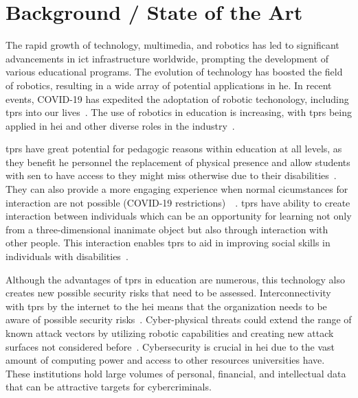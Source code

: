 
\newpage


\section{Background / State of the Art}

The rapid growth of technology, multimedia, and robotics has led to significant advancements in \ac{ict} infrastructure worldwide, prompting
the development of various educational programs. The
evolution
of technology has boosted the field
of robotics,
resulting in a
wide array
of potential applications in \ac{he}. In recent events, COVID-19 has expedited the adoptation of robotic techonology, including \ac{tprs}
into
our lives~\cite[193]{humans_and_robots_relation_2021}. The use of robotics in education is increasing,
with \ac{tprs} being applied in \ac{hei} and other diverse roles in the industry~\cite[]{telepresence_robots_in_classroom_2019,higher_edu_perception_on_tprs_2022}.

\ac{tprs} have great potential for pedagogic reasons within education at all levels, as they benefit \ac{he} personnel the replacement of
physical
presence and allow students with \ac{sen} to have access to  they might miss otherwise due to their disabilities~\cite[546]{
  telepresence_robots_in_classroom_2019}. They can also provide a more engaging experience when normal cicumstances for interaction are not
possible (COVID-19 restrictions)~\cite[197]{humans_and_robots_relation_2021}~\cite[1]{higher_edu_perception_on_tprs_2022}.
\ac{tprs} have ability to create interaction between individuals which can be an opportunity for learning not only from a three-dimensional
inanimate
object but also through interaction with other people. This interaction enables \ac{tprs} to aid in improving social
skills in individuals with disabilities~\cite[541]{telepresence_robots_in_classroom_2019}.

Although the advantages of \ac{tprs} in education are numerous, this technology also creates new possible security risks that need to be
assessed. Interconnectivity with \ac{tprs} by the internet to the \ac{hei} means that the organization needs to be aware of possible
security risks~\cite[120]{robotics_cyber_security_2022}. Cyber-physical threats could extend the range of known attack vectors by
utilizing robotic capabilities and creating new attack surfaces not considered before~\cite[18-19]{analyzing_cyber_physical_threats_2018}.
Cybersecurity
is crucial in \ac{hei} due
to the vast amount
of computing power and access to other resources
universities
have. These institutions hold large volumes of personal, financial, and intellectual data that can be attractive targets for cybercriminals.

